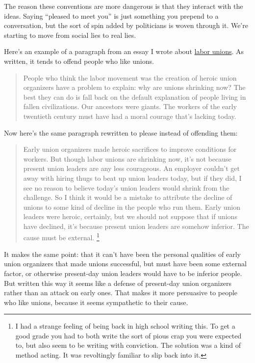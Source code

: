\documentclass[12pt]{book}
\begin{document}
The reason these conventions are more dangerous is that they interact
with the ideas. Saying ``pleased to meet you'' is just something you
prepend to a conversation, but the sort of spin added by politicians is
woven through it. We're starting to move from social lies to real lies.

Here's an example of a paragraph from an essay I wrote about
\href{unions.html}{labor unions}. As written, it tends to offend people
who like unions.

\begin{quote}
People who think the labor movement was the creation of heroic union
organizers have a problem to explain: why are unions shrinking now? The
best they can do is fall back on the default explanation of people
living in fallen civilizations. Our ancestors were giants. The workers
of the early twentieth century must have had a moral courage that's
lacking today.
\end{quote}

Now here's the same paragraph rewritten to please instead of offending
them:

\begin{quote}
Early union organizers made heroic sacrifices to improve conditions for
workers. But though labor unions are shrinking now, it's not because
present union leaders are any less courageous. An employer couldn't get
away with hiring thugs to beat up union leaders today, but if they did,
I see no reason to believe today's union leaders would shrink from the
challenge. So I think it would be a mistake to attribute the decline of
unions to some kind of decline in the people who run them. Early union
leaders were heroic, certainly, but we should not suppose that if unions
have declined, it's because present union leaders are somehow inferior.
The cause must be external. \footnote{I had a strange feeling of being back in high school writing
this. To get a good grade you had to both write the sort of pious crap
you were expected to, but also seem to be writing with conviction. The
solution was a kind of method acting. It was revoltingly familiar to
slip back into it.}
\end{quote}

It makes the same point: that it can't have been the personal qualities
of early union organizers that made unions successful, but must have
been some external factor, or otherwise present-day union leaders would
have to be inferior people. But written this way it seems like a defense
of present-day union organizers rather than an attack on early ones.
That makes it more persuasive to people who like unions, because it
seems sympathetic to their cause.
\end{document}
